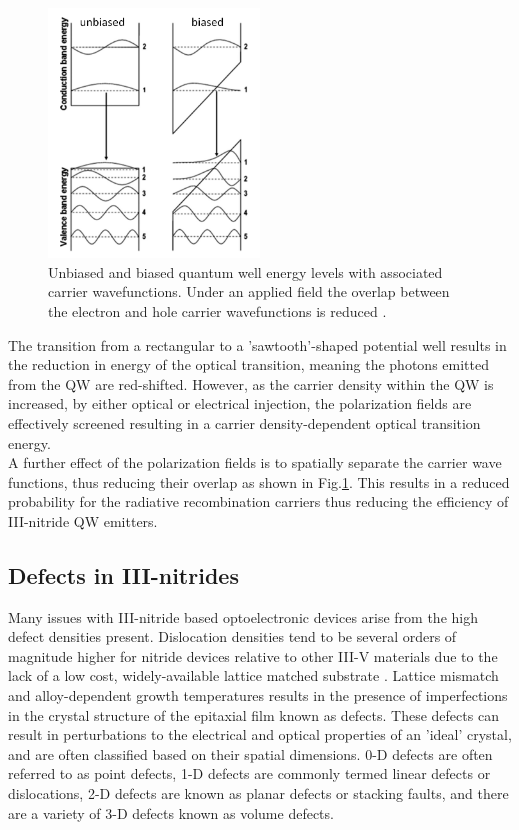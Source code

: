 \begin{figure}[h]
	\centering
	\includegraphics[width=0.5\textwidth]{Figs/Ch1/QCSE.png}
	\caption {Unbiased and biased quantum well energy levels with associated carrier wavefunctions. Under an applied field the overlap between the electron and hole carrier wavefunctions is reduced \cite{Ryou2009}.}
	\label{1.5}
\end{figure}
\FloatBarrier 

The transition from a rectangular to a 'sawtooth'-shaped potential well results in the reduction in energy of the optical transition, meaning the photons emitted from the QW are red-shifted. However, as the carrier density within the QW is increased, by either optical or electrical injection, the polarization fields are effectively screened resulting in a carrier density-dependent optical transition energy.\\
A further effect of the polarization fields is to spatially separate the carrier wave functions, thus reducing their overlap as shown in Fig.\ref{1.5}. This results in a reduced probability for the radiative recombination carriers thus reducing the efficiency of III-nitride QW emitters.
\subsection{Defects in III-nitrides}  %
\label{section1.1.4}
Many issues with III-nitride based optoelectronic devices arise from the high defect densities present. Dislocation densities tend to be several orders of magnitude higher for nitride devices relative to other III-V materials due to the lack of a low cost, widely-available lattice matched substrate \cite{Bennett2010b}. Lattice mismatch and alloy-dependent growth temperatures results in the presence of imperfections in the crystal structure of the epitaxial film known as defects. These defects can result in perturbations to the electrical and optical properties of an 'ideal' crystal, and are often classified based on their spatial dimensions. 0-D defects are often referred to as point defects, 1-D defects are commonly termed linear defects or dislocations, 2-D defects are known as planar defects or stacking faults, and there are a variety of 3-D defects known as volume defects.

